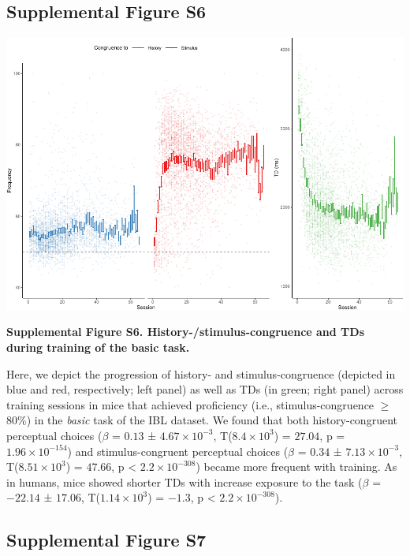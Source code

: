 \documentclass[
]{article}
\begin{document}
\newpage

\hypertarget{supplemental-figure-s6}{%
\subsection{Supplemental Figure S6}\label{supplemental-figure-s6}}

\includegraphics{modes_mouse_files/figure-latex/Supplemental_Figure_S6-1.pdf}

\textbf{Supplemental Figure S6. History-/stimulus-congruence and TDs
during training of the basic task.}

Here, we depict the progression of history- and stimulus-congruence
(depicted in blue and red, respectively; left panel) as well as TDs (in
green; right panel) across training sessions in mice that achieved
proficiency (i.e., stimulus-congruence \(\geq\) 80\%) in the
\emph{basic} task of the IBL dataset. We found that both
history-congruent perceptual choices (\(\beta\) = \(0.13\) ±
\(\ensuremath{4.67\times 10^{-3}}\),
T(\(\ensuremath{8.4\times 10^{3}}\)) = \(27.04\), p =
\(\ensuremath{1.96\times 10^{-154}}\)) and stimulus-congruent perceptual
choices (\(\beta\) = \(0.34\) ± \(\ensuremath{7.13\times 10^{-3}}\),
T(\(\ensuremath{8.51\times 10^{3}}\)) = \(47.66\), p < \(\ensuremath{2.2\times 10^{-308}}\)) became
more frequent with training. As in humans, mice showed shorter TDs with
increase exposure to the task (\(\beta\) = \(-22.14\) ± \(17.06\),
T(\(\ensuremath{1.14\times 10^{3}}\)) = \(-1.3\), p < \(\ensuremath{2.2\times 10^{-308}}\)).

\newpage

\hypertarget{supplemental-figure-s7}{%
\subsection{Supplemental Figure S7}\label{supplemental-figure-s7}}
\end{document}
